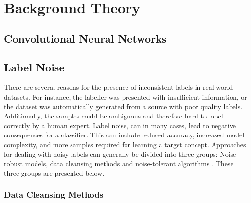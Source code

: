 \section{Background Theory}
\label{sec:background_theory}
\subsection{Convolutional Neural Networks}

\label{sec:convolutional_networks_background}

\subsection{Label Noise}
\label{sec:background_label_noise}
There are several reasons for the presence of inconsistent labels in real-world datasets. For instance, the labeller was presented with insufficient information, or the dataset was automatically generated from a source with poor quality labels. Additionally, the samples could be ambiguous and therefore hard to label correctly by a human expert. Label noise, can in many cases, lead to negative consequences for a classifier. This can include reduced accuracy, increased model complexity, and more samples required for learning a target concept. Approaches for dealing with noisy labels can generally be divided into three groups: Noise-robust models, data cleansing methods and noise-tolerant algorithms \citep{Frenay_label_noise_survey}. These three groups are presented below.  \\






\subsubsection{Data Cleansing Methods}

